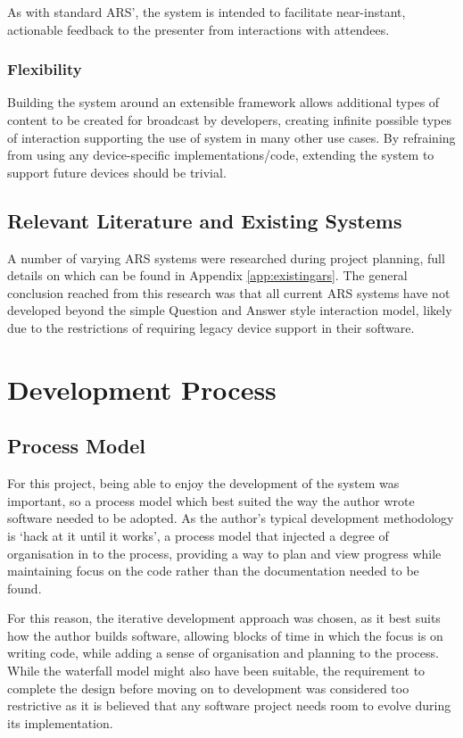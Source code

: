 \documentclass[a4papert,11pt,notitlepage]{ltxdoc}
\begin{document}
As with standard ARS', the system is intended to facilitate near-instant, actionable feedback to the presenter from interactions with attendees.

\subsubsection{Flexibility}
Building the system around an extensible framework allows additional types of content to be created for broadcast by developers, creating infinite possible types of interaction supporting the use of system in many other use cases. By refraining from using any device-specific implementations/code, extending the system to support future devices should be trivial.

\subsection{Relevant Literature and Existing Systems}
A number of varying ARS systems were researched during project planning, full details on which can be found in Appendix \ref{app:existingars}. The general conclusion reached from this research was that all current ARS systems have not developed beyond the simple Question and Answer style interaction model, likely due to the restrictions of requiring legacy device support in their software.

\pagebreak

\section{Development Process}
\subsection{Process Model}
For this project, being able to enjoy the development of the system was important, so a process model which best suited the way the author wrote software needed to be adopted. As the author's typical development methodology is `hack at it until it works', a process model that injected a degree of organisation in to the process, providing a way to plan and view progress while maintaining focus on the code rather than the documentation needed to be found.

For this reason, the iterative development approach was chosen, as it best suits how the author builds software, allowing blocks of time in which the focus is on writing code, while adding a sense of organisation and planning to the process. While the waterfall model might also have been suitable, the requirement to complete the design before moving on to development was considered too restrictive as it is believed that any software project needs room to evolve during its implementation.
\end{document}
